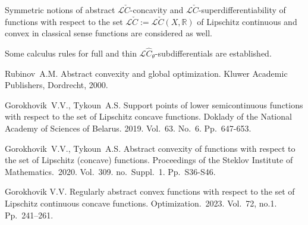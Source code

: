 \documentclass[12pt]{llncs}
\begin{document}
Symmetric notions of abstract ${\mathcal{L}\check{C}}$-concavity and ${\mathcal{L}\check{C}}$-superdifferentiability of functions with respect to the set ${\mathcal{L}\check{C}}:={\mathcal{L}\check{C}}(X,{\mathbb{R}})$ of Lipschitz continuous and convex in classical sense functions are considered as well.

Some calculus rules for full and thin ${{{\mathcal L}\widehat{C}}_\theta}$-subdifferentials are established.

%

\begin{thebibliography}{9} %

Rubinov~A.M. Abstract convexity and global optimization. Kluwer Academic Publishers, Dordrecht, 2000.

Gorokhovik~V.V., Tykoun~A.S. Support points of lower semicontinuous functions
with respect to the set of Lipschitz concave functions. Doklady of the National Academy of Sciences of Belarus. 2019. Vol.~63. No.~6. Pp.~647-653.

Gorokhovik~V.V., Tykoun~A.S. Abstract convexity of functions with respect to the set of Lipschitz (concave) functions. Proceedings of the Steklov Institute of Mathematics.~2020. Vol.~309. no.~Suppl.~1. Pp.~S36-S46.

 Gorokhovik V.V. Regularly abstract convex functions with respect to the set of Lipschitz continuous concave functions. Optimization.~2023. Vol.~72, no.1. Pp.~241--261.

\end{thebibliography}
\end{document}
